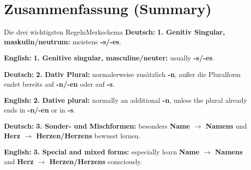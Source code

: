 \documentclass[a4paper,11pt]{article}
\newcommand{\GermanText}[1]{\textbf{Deutsch: }#1\par}
\newcommand{\EnglishText}[1]{{\small\color{SoftGray}\textbf{English: }#1\par}}
\begin{document}
\section{Zusammenfassung \textnormal{(Summary)}}
\begin{grammarentry}{Die drei wichtigsten Regeln}{Merkschema}
\GermanText{\textbf{1. Genitiv Singular, maskulin/neutrum:} meistens \textbf{-s/-es}.}
\EnglishText{\textbf{1. Genitive singular, masculine/neuter:} usually \textbf{-s/-es}.}

\GermanText{\textbf{2. Dativ Plural:} normalerweise zusätzlich \textbf{-n}, außer die Pluralform endet bereits auf \textbf{-n/-en} oder auf \textbf{-s}.}
\EnglishText{\textbf{2. Dative plural:} normally an additional \textbf{-n}, unless the plural already ends in \textbf{-n/-en} or in \textbf{-s}.}

\GermanText{\textbf{3. Sonder- und Mischformen:} besonders \textbf{Name $\rightarrow$ Namens} und \textbf{Herz $\rightarrow$ Herzen/Herzens} bewusst lernen.}
\EnglishText{\textbf{3. Special and mixed forms:} especially learn \textbf{Name $\rightarrow$ Namens} and \textbf{Herz $\rightarrow$ Herzen/Herzens} consciously.}
\end{grammarentry}
\end{document}
